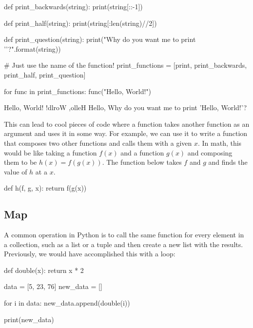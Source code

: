 \documentclass[11pt]{cselabheader}
\begin{document}
\begin{python3code}
def print_backwards(string):
    print(string[::-1])

def print_half(string):
    print(string[:len(string)//2])

def print_question(string):
    print("Why do you want me to print '{}'?".format(string))

# Just use the name of the function!
print_functions = [print, print_backwards, print_half, print_question]

for func in print_functions:
    func("Hello, World!")
\end{python3code}

\begin{verbatimcode}
Hello, World!
!dlroW ,olleH
Hello,
Why do you want me to print 'Hello, World!'?
\end{verbatimcode}

This can lead to cool pieces of code where a function takes another function as
an argument and uses it in some way. For example, we can use it to write a
function that composes two other functions and calls them with a given $x$. In
math, this would be like taking a function $f(x)$ and a function $g(x)$ and
composing them to be $h(x) = f(g(x))$. The function below takes $f$ and $g$ and
finds the value of $h$ at a $x$.

\begin{python3code}
def h(f, g, x):
  return f(g(x))
\end{python3code}

\subsection{Map}
\label{subsec:map}
A common operation in Python is to call the same function for every element in a
collection, such as a list or a tuple and then create a new list with the
results. Previously, we would have accomplished this with a 
loop:

\begin{python3code}
def double(x):
    return x * 2

data = [5, 23, 76]
new_data = []

for i in data:
    new_data.append(double(i))

print(new_data)
\end{python3code}

\begin{verbatimcode}
[10, 46, 152]
\end{verbatimcode}
\end{document}
